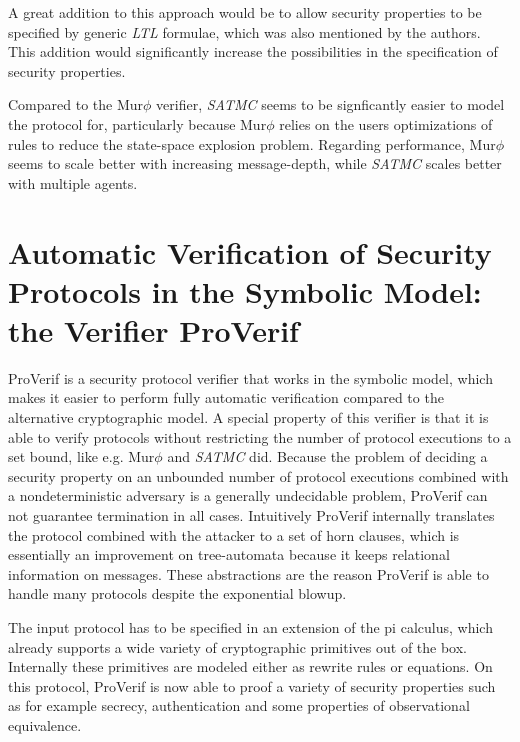 \documentclass[a4paper,UKenglish]{lipics-v2018}
\def\murphi{Mur$\phi$ }
\begin{document}
A great addition to this approach would be to allow security properties to be specified by generic \textit{LTL} formulae, which was also mentioned by the authors. This addition would significantly increase the possibilities in the specification of security properties.

Compared to the \murphi verifier, \textit{SATMC} seems to be signficantly easier to model the protocol for, particularly because \murphi relies on the users optimizations of rules to reduce the state-space explosion problem. Regarding performance, \murphi seems to scale better with increasing message-depth, while \textit{SATMC} scales better with multiple agents.




\section{Automatic Verification of Security Protocols in the Symbolic Model: the Verifier ProVerif}

ProVerif is a security protocol verifier that works in the symbolic model, which makes it easier to perform fully automatic verification compared to the alternative cryptographic model. 
A special property of this verifier is that it is able to verify protocols without restricting the number of protocol executions to a set bound, like e.g. \murphi \cite{murphi} and \textit{SATMC}\cite{sat} did. Because the problem of deciding a security property on an unbounded number of protocol executions combined with a nondeterministic adversary is a generally undecidable problem, ProVerif can not guarantee termination in all cases. Intuitively ProVerif internally translates the protocol combined with the attacker to a set of horn clauses, which is essentially an improvement on tree-automata because it keeps relational information on messages. These abstractions are the reason ProVerif is able to handle many protocols despite the exponential blowup.\cite{ProVerif}

The input protocol has to be specified in an extension of the pi calculus, which already supports a wide variety of cryptographic primitives out of the box. Internally these primitives are modeled either as rewrite rules or equations. On this protocol, ProVerif is now able to proof a variety of security properties such as for example secrecy, authentication and some properties of observational equivalence.\cite{ProVerif}
\end{document}
